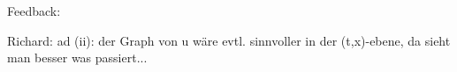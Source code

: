 Feedback:

Richard:
ad (ii): der Graph von u wäre evtl. sinnvoller in der (t,x)-ebene, da sieht man besser was passiert...
